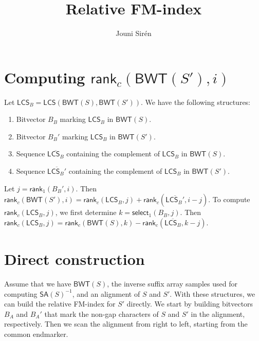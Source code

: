 \documentclass[11pt,a4paper]{article}
\newcommand{\BWT}
  {\ensuremath{\mathsf{BWT}}}
\newcommand{\SA}
  {\ensuremath{\mathsf{SA}}}
\newcommand{\LCS}
  {\ensuremath{\mathsf{LCS}}}
\newcommand{\mrank}{\ensuremath{\mathsf{rank}}}
\newcommand{\mselect}{\ensuremath{\mathsf{select}}}
\begin{document}
\title{Relative FM-index}
\author{Jouni Sir\'en}
\maketitle

\section*{Computing $\mrank_{c}(\BWT(S'), i)$}

Let $\LCS_{B} = \LCS(\BWT(S), \BWT(S'))$. We have the following structures:
\begin{enumerate}
\item Bitvector $B_{B}$ marking $\LCS_{B}$ in $\BWT(S)$.
\item Bitvector $B_{B}'$ marking $\LCS_{B}$ in $\BWT(S')$.
\item Sequence $\overline{\LCS_{B}}$ containing the complement of $\LCS_{B}$ in $\BWT(S)$.
\item Sequence $\overline{\LCS_{B}'}$ containing the complement of $\LCS_{B}$ in $\BWT(S')$.
\end{enumerate}

Let $j = \mrank_{1}(B_{B}', i)$. Then $\mrank_{c}(\BWT(S'), i) = \mrank_{c}(\LCS_{B}, j) + \mrank_{c}(\overline{\LCS_{B}'}, i-j).$ To compute $\mrank_{c}(\LCS_{B}, j)$, we first determine $k = \mselect_{1}(B_{B}, j)$. Then $\mrank_{c}(\LCS_{B}, j) = \mrank_{c}(\BWT(S), k) - \mrank_{c}(\overline{\LCS_{B}}, k-j)$.



\section*{Direct construction}

Assume that we have $\BWT(S)$, the inverse suffix array samples used for computing $\SA(S)^{-1}$, and an alignment of $S$ and $S'$. With these structures, we can build the relative FM-index for $S'$ directly. We start by building bitvectors $B_{A}$ and $B_{A}'$ that mark the non-gap characters of $S$ and $S'$ in the alignment, respectively. Then we scan the alignment from right to left, starting from the common endmarker.
\end{document}
